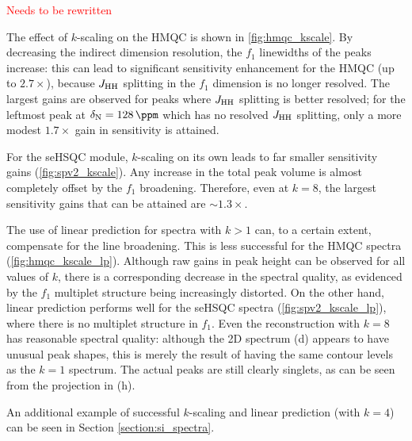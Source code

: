\textcolor{red}{Needs to be rewritten}

The effect of $k$-scaling on the HMQC is shown in \cref{fig:hmqc_kscale}.
By decreasing the indirect dimension resolution, the $f_1$ linewidths of the peaks increase: this can lead to significant sensitivity enhancement for the HMQC (up to $2.7 \times$), because $\jhh$ splitting in the $f_1$ dimension is no longer resolved.
The largest gains are observed for peaks where $\jhh$ splitting is better resolved; for the leftmost peak at $\delta_{\ce{N}} = \SI{128}{\ppm}$ which has no resolved $\jhh$ splitting, only a more modest $1.7 \times$ gain in sensitivity is attained.

For the seHSQC module, $k$-scaling on its own leads to far smaller sensitivity gains (\cref{fig:spv2_kscale}).
Any increase in the total peak volume is almost completely offset by the $f_1$ broadening.
Therefore, even at $k = 8$, the largest sensitivity gains that can be attained are $\sim 1.3\times$.

The use of linear prediction for spectra with $k > 1$ can, to a certain extent, compensate for the line broadening.
This is less successful for the HMQC spectra (\cref{fig:hmqc_kscale_lp}).
Although raw gains in peak height can be observed for all values of $k$, there is a corresponding decrease in the spectral quality, as evidenced by the $f_1$ multiplet structure being increasingly distorted.
On the other hand, linear prediction performs well for the seHSQC spectra (\cref{fig:spv2_kscale_lp}), where there is no multiplet structure in $f_1$.
Even the reconstruction with $k = 8$ has reasonable spectral quality: although the 2D spectrum (d) appears to have unusual peak shapes, this is merely the result of having the same contour levels as the $k = 1$ spectrum.
The actual peaks are still clearly singlets, as can be seen from the projection in (h).

An additional example of successful $k$-scaling and linear prediction (with $k = 4$) can be seen in Section \ref{section:si_spectra}.

